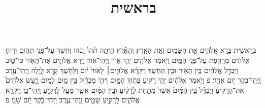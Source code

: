 \documentclass{openreader}
\title{בראשית}
\date{}
\begin{document}
\maketitle
\raggedbottom 
\fontsize{16pt}{24pt}\selectfont


בְּרֵאשִׁ֖ית בָּרָ֣א אֱלֹהִ֑ים אֵ֥ת הַשָּׁמַ֖יִם וְאֵ֥ת הָאָֽרֶץ׃ 
וְהָאָ֗רֶץ הָיְתָ֥ה תֹ֨הוּ֙ וָבֹ֔הוּ וְחֹ֖שֶׁךְ עַל־פְּנֵ֣י תְהֹ֑ום וְר֣וּחַ אֱלֹהִ֔ים מְרַחֶ֖פֶת עַל־פְּנֵ֥י הַמָּֽיִם׃ 
וַיֹּ֥אמֶר אֱלֹהִ֖ים יְהִ֣י אֹ֑ור וַֽיְהִי־אֹֽור׃ 
וַיַּ֧רְא אֱלֹהִ֛ים אֶת־הָאֹ֖ור כִּי־טֹ֑וב וַיַּבְדֵּ֣ל אֱלֹהִ֔ים בֵּ֥ין הָאֹ֖ור וּבֵ֥ין הַחֹֽשֶׁךְ׃ 
וַיִּקְרָ֨א אֱלֹהִ֤ים׀ לָאֹור֙ יֹ֔ום וְלַחֹ֖שֶׁךְ קָ֣רָא לָ֑יְלָה וַֽיְהִי־עֶ֥רֶב וַֽיְהִי־בֹ֖קֶר יֹ֥ום אֶחָֽד׃ פ 
וַיֹּ֣אמֶר אֱלֹהִ֔ים יְהִ֥י רָקִ֖יעַ בְּתֹ֣וךְ הַמָּ֑יִם וִיהִ֣י מַבְדִּ֔יל בֵּ֥ין מַ֖יִם לָמָֽיִם׃ 
וַיַּ֣עַשׂ אֱלֹהִים֮ אֶת־הָרָקִיעַ֒ וַיַּבְדֵּ֗ל בֵּ֤ין הַמַּ֨יִם֙ אֲשֶׁר֙ מִתַּ֣חַת לָרָקִ֔יעַ וּבֵ֣ין הַמַּ֔יִם אֲשֶׁ֖ר מֵעַ֣ל לָרָקִ֑יעַ וַֽיְהִי־כֵֽן׃ 
וַיִּקְרָ֧א אֱלֹהִ֛ים לָֽרָקִ֖יעַ שָׁמָ֑יִם וַֽיְהִי־עֶ֥רֶב וַֽיְהִי־בֹ֖קֶר יֹ֥ום שֵׁנִֽי׃ פ 
\end{document}
